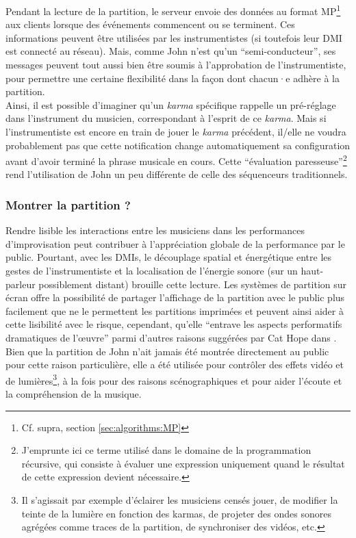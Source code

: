 \noindent Pendant la lecture de la partition, le serveur envoie des données au format MP\footnote{Cf. supra, section \ref{sec:algorithms:MP}} aux clients lorsque des événements commencent ou se terminent. Ces informations peuvent être utilisées par les instrumentistes (si toutefois leur \gls{DMI} est connecté au réseau). Mais, comme John n'est qu'un ``semi-conducteur'', ses messages peuvent tout aussi bien être soumis à l'approbation de l'instrumentiste, pour permettre une certaine flexibilité dans la façon dont chacun·e adhère à la partition.\\
\indent Ainsi, il est possible d'imaginer qu'un \textit{karma} spécifique rappelle un pré-réglage dans l'instrument du musicien, correspondant à l'esprit de ce \textit{karma}. Mais si l'instrumentiste est encore en train de jouer le \textit{karma} précédent, il/elle ne voudra probablement pas que cette notification change automatiquement sa configuration avant d'avoir terminé la phrase musicale en cours. Cette ``évaluation paresseuse''\footnote{J'emprunte ici ce terme utilisé dans le domaine de la programmation récursive, qui consiste à évaluer une expression uniquement quand le résultat de cette expression devient nécessaire.} rend l'utilisation de John un peu différente de celle des séquenceurs traditionnels.
\subsubsection{Montrer la partition ?}

\noindent Rendre lisible les interactions entre les musiciens dans les performances d'improvisation peut contribuer à l'appréciation globale de la performance par le public. Pourtant, avec les \glspl{DMI}, le découplage spatial et énergétique entre les gestes de l'instrumentiste et la localisation de l'énergie sonore (sur un haut-parleur possiblement distant) brouille cette lecture. Les systèmes de partition sur écran offre la possibilité de partager l'affichage de la partition avec le public plus facilement que ne le permettent les partitions imprimées et peuvent ainsi aider à cette lisibilité avec le risque, cependant, qu'elle ``entrave les aspects performatifs dramatiques de l'œuvre'' parmi d'autres raisons suggérées par Cat Hope dans \cite{hope_screen_2011}.\\
\indent Bien que la partition de John n'ait jamais été montrée directement au public pour cette raison particulière, elle a été utilisée pour contrôler des effets vidéo et de lumières\footnote{Il s'agissait par exemple d'éclairer les musiciens censés jouer, de modifier la teinte de la lumière en fonction des karmas, de projeter des ondes sonores agrégées comme traces de la partition, de synchroniser des vidéos, etc.}, à la fois pour des raisons scénographiques et pour aider l'écoute et la compréhension de la musique.

